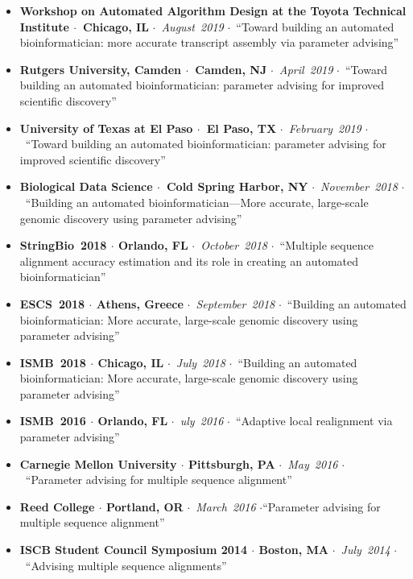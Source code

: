 \documentclass[10pt,letterpaper]{article}
\newcommand{\bigdot}{$\cdot$\xspace}
\begin{document}
\begin{itemize}[leftmargin=*,labelindent=5pt,itemindent=-15pt]
  \item \textbf{Workshop on Automated Algorithm Design at the Toyota Technical Institute \bigdot~Chicago, IL} \bigdot~\textit{August~2019} \bigdot~``Toward building an automated bioinformatician: more accurate transcript assembly via parameter advising''
  \item \textbf{Rutgers University, Camden \bigdot~Camden, NJ} \bigdot~\textit{April~2019} \bigdot~``Toward building an automated bioinformatician: 
parameter advising for improved scientific discovery''
  \item \textbf{University of Texas at El Paso \bigdot~El Paso, TX} \bigdot~\textit{February~2019} \bigdot~``Toward building an automated bioinformatician: 
parameter advising for improved scientific discovery''
  \item \textbf{Biological Data Science \bigdot~Cold Spring Harbor, NY} \bigdot~\textit{November~2018} \bigdot~``Building an automated bioinformatician---More accurate, large-scale genomic discovery using parameter advising'' 
   \item \textbf{StringBio~2018 \bigdot Orlando, FL} \bigdot~\textit{October~2018} \bigdot~``Multiple sequence alignment accuracy estimation and its role in creating an automated bioinformatician'' 
   \item \textbf{ESCS~2018 \bigdot Athens, Greece} \bigdot~\textit{September~2018} \bigdot~``Building an automated bioinformatician: More accurate, large-scale genomic discovery using parameter advising''
    \item \textbf{ISMB~2018 \bigdot Chicago, IL} \bigdot~\textit{July~2018} \bigdot~``Building an automated bioinformatician: More accurate, large-scale genomic discovery using parameter advising''
    \item \textbf{ISMB~2016 \bigdot Orlando, FL} \bigdot~\textit{uly~2016} \bigdot~``Adaptive local realignment via parameter advising'' 
    \item \textbf{Carnegie Mellon University \bigdot Pittsburgh, PA} \bigdot~\textit{May~2016} \bigdot~``Parameter advising for multiple sequence alignment''
    \item \textbf{Reed College \bigdot Portland, OR} \bigdot~\textit{March~2016} \bigdot ``Parameter advising for multiple sequence alignment''
    \item \textbf{ISCB Student Council Symposium 2014 \bigdot  Boston, MA} \bigdot~\textit{July~2014} \bigdot~``Advising multiple sequence alignments''
   
\end{itemize}
\end{document}
